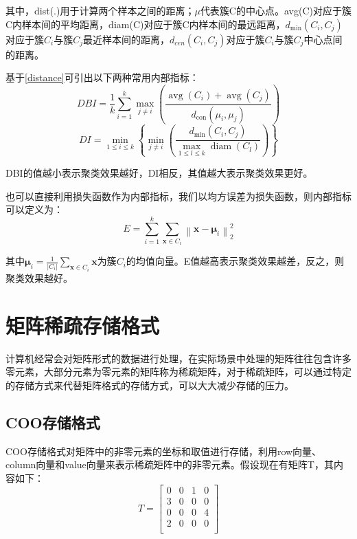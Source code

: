 其中，dist(.)用于计算两个样本之间的距离；$\mu$代表簇C的中心点。avg(C)对应于簇C内样本间的平均距离，diam(C)对应于簇C内样本间的最远距离，$d_{\min }\left(C_{i}, C_{j}\right)$对应于簇$C_i$与簇$C_j$最近样本间的距离，$d_{cen}\left(C_{i}, C_{j}\right)$对应于簇$C_i$与簇$C_j$中心点间的距离。

基于\ref{distance}可引出以下两种常用内部指标：
\begin{equation}
\label{DBI}
DBI=\frac{1}{k} \sum_{i=1}^{k} \max _{j \neq i}\left(\frac{\operatorname{avg}\left(C_{i}\right)+\operatorname{avg}\left(C_{j}\right)}{d_{\operatorname{con}}\left(\mu_{i}, \mu_{j}\right)}\right)
\end{equation}
\begin{equation}
\label{DI}
DI=\min _{1 \leqslant i \leqslant k}\left\{\min _{j \neq i}\left(\frac{d_{\min }\left(C_{i}, C_{j}\right)}{\max _{1 \leqslant l \leqslant k} \operatorname{diam}\left(C_{l}\right)}\right)\right\}
\end{equation}

DBI的值越小表示聚类效果越好，DI相反，其值越大表示聚类效果更好。

也可以直接利用损失函数作为内部指标，我们以均方误差为损失函数，则内部指标可以定义为：
\begin{equation}
\label{kmeanscost}
E=\sum_{i=1}^{k} \sum_{\boldsymbol{x} \in C_{i}}\left\|\boldsymbol{x}-\boldsymbol{\mu}_{i}\right\|_{2}^{2}
\end{equation}

其中$\boldsymbol{\mu}_{i}=\frac{1}{\left|C_{i}\right|} \sum_{\boldsymbol{x} \in C_{i}} \boldsymbol{x}$为簇$C_i$的均值向量。E值越高表示聚类效果越差，反之，则聚类效果越好。

\section{矩阵稀疏存储格式}

计算机经常会对矩阵形式的数据进行处理，在实际场景中处理的矩阵往往包含许多零元素，大部分元素为零元素的矩阵称为稀疏矩阵，对于稀疏矩阵，可以通过特定的存储方式来代替矩阵格式的存储方式，可以大大减少存储的压力。

\subsection{COO存储格式}

COO存储格式对矩阵中的非零元素的坐标和取值进行存储，利用row向量、column向量和value向量来表示稀疏矩阵中的非零元素。假设现在有矩阵T，其内容如下：
\[T=\left[ \begin{matrix}
	0&		0&		1&		0\\
	3&		0&		0&		0\\
	0&		0&		0&		4\\
	2&		0&		0&		0\\
\end{matrix} \right] \]

